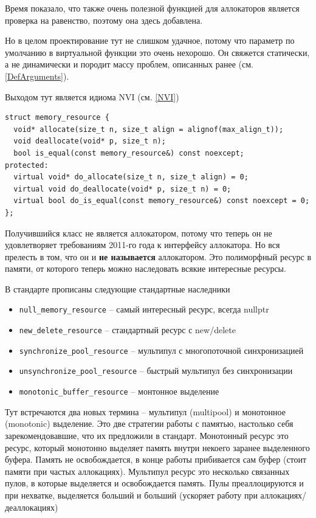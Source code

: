 \documentclass[a4paper,12pt,oneside]{book}
\begin{document}
Время показало, что также очень полезной функцией для аллокаторов является проверка на равенство, поэтому она здесь добавлена.

Но в целом проектирование тут не слишком удачное, потому что параметр по умолчанию в виртуальной функции это очень нехорошо. Он свяжется статически, а не динамически и породит массу проблем, описанных ранее (см. \ref{DefArguments}).

Выходом тут является идиома NVI (см. \ref{NVI})

\begin{lstlisting}
struct memory_resource {
  void* allocate(size_t n, size_t align = alignof(max_align_t));
  void deallocate(void* p, size_t n);
  bool is_equal(const memory_resource&) const noexcept;
protected:
  virtual void* do_allocate(size_t n, size_t align) = 0;
  virtual void do_deallocate(void* p, size_t n) = 0;
  virtual bool do_is_equal(const memory_resource&) const noexcept = 0;
};
\end{lstlisting}

Получившийся класс не является аллокатором, потому что теперь он не удовлетворяет требованиям 2011-го года к интерфейсу аллокатора. Но вся прелесть в том, что он и \textbf{не называется} аллокатором. Это полиморфный ресурс в памяти, от которого теперь можно наследовать всякие интересные ресурсы.

В стандарте прописаны следующие стандартные наследники

\begin{itemize}
\item \lstinline!null_memory_resource! – самый интересный ресурс, всегда nullptr
\item \lstinline!new_delete_resource! – стандартный ресурс с new/delete
\item \lstinline!synchronize_pool_resource! – мультипул с многопоточной синхронизацией
\item \lstinline!unsynchronize_pool_resource! – быстрый мультипул без синхронизации
\item \lstinline!monotonic_buffer_resource! – монтонное выделение
\end{itemize}

Тут встречаются два новых термина – мультипул (multipool) и монотонное (monotonic) выделение. Это две стратегии работы с памятью, настолько себя зарекомендовавшие, что их предложили в стандарт. Монотонный ресурс это ресурс, который монотонно выделяет память внутри некоего заранее выделенного буфера. Память не освобождается, в конце работы прибивается сам буфер (стоит памяти при частых аллокациях). Мультипул ресурс это несколько связанных пулов, в которые выделяется и освобождается память. Пулы преаллоцируются и при нехватке, выделяется больший и больший (ускоряет работу при аллокациях/деаллокациях)
\end{document}
